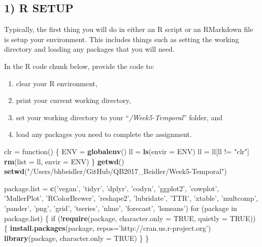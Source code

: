 \documentclass[]{article}
\newenvironment{Shaded}{\begin{snugshade}}{\end{snugshade}}
\newcommand{\KeywordTok}[1]{\textcolor[rgb]{0.13,0.29,0.53}{\textbf{{#1}}}}
\newcommand{\DataTypeTok}[1]{\textcolor[rgb]{0.13,0.29,0.53}{{#1}}}
\newcommand{\StringTok}[1]{\textcolor[rgb]{0.31,0.60,0.02}{{#1}}}
\newcommand{\OtherTok}[1]{\textcolor[rgb]{0.56,0.35,0.01}{{#1}}}
\newcommand{\NormalTok}[1]{{#1}}
\providecommand{\tightlist}{%
  \setlength{\itemsep}{0pt}\setlength{\parskip}{0pt}}
\begin{document}
\subsection{1) R SETUP}\label{r-setup}

Typically, the first thing you will do in either an R script or an
RMarkdown file is setup your environment. This includes things such as
setting the working directory and loading any packages that you will
need.

In the R code chunk below, provide the code to:

\begin{enumerate}
\def\labelenumi{\arabic{enumi}.}
\tightlist
\item
  clear your R environment,
\item
  print your current working directory,
\item
  set your working directory to your ``\emph{/Week5-Temporal}'' folder,
  and
\item
  load any packages you need to complete the assignment.
\end{enumerate}

\begin{Shaded}
\begin{Highlighting}[]
\NormalTok{clr =}\StringTok{ }\NormalTok{function() \{}
  \NormalTok{ENV =}\StringTok{ }\KeywordTok{globalenv}\NormalTok{()}
  \NormalTok{ll =}\StringTok{ }\KeywordTok{ls}\NormalTok{(}\DataTypeTok{envir =} \NormalTok{ENV)}
  \NormalTok{ll =}\StringTok{ }\NormalTok{ll[ll !=}\StringTok{ "clr"}\NormalTok{]}
  \KeywordTok{rm}\NormalTok{(}\DataTypeTok{list =} \NormalTok{ll, }\DataTypeTok{envir =} \NormalTok{ENV)}
\NormalTok{\}}
\KeywordTok{getwd}\NormalTok{() }
\KeywordTok{setwd}\NormalTok{(}\StringTok{"/Users/bhbeidler/GitHub/QB2017_Beidler/Week5-Temporal"}\NormalTok{)}

\NormalTok{package.list =}\StringTok{ }\KeywordTok{c}\NormalTok{(}\StringTok{'vegan'}\NormalTok{, }\StringTok{'tidyr'}\NormalTok{, }\StringTok{'dplyr'}\NormalTok{, }\StringTok{'codyn'}\NormalTok{, }\StringTok{'ggplot2'}\NormalTok{,}
\StringTok{'cowplot'}\NormalTok{, }\StringTok{'MullerPlot'}\NormalTok{, }\StringTok{'RColorBrewer'}\NormalTok{, }\StringTok{'reshape2'}\NormalTok{, }\StringTok{'lubridate'}\NormalTok{,}
\StringTok{'TTR'}\NormalTok{, }\StringTok{'xtable'}\NormalTok{, }\StringTok{'multcomp'}\NormalTok{, }\StringTok{'pander'}\NormalTok{, }\StringTok{'png'}\NormalTok{, }\StringTok{'grid'}\NormalTok{, }\StringTok{'tseries'}\NormalTok{, }\StringTok{'nlme'}\NormalTok{, }\StringTok{'forecast'}\NormalTok{, }\StringTok{'lsmeans'}\NormalTok{)}
\NormalTok{for (package in package.list) \{}
\NormalTok{if (!}\KeywordTok{require}\NormalTok{(package, }\DataTypeTok{character.only =} \OtherTok{TRUE}\NormalTok{, }\DataTypeTok{quietly =} \OtherTok{TRUE}\NormalTok{)) \{}
\KeywordTok{install.packages}\NormalTok{(package, }\DataTypeTok{repos=}\StringTok{'http://cran.us.r-project.org'}\NormalTok{)}
\KeywordTok{library}\NormalTok{(package, }\DataTypeTok{character.only =} \OtherTok{TRUE}\NormalTok{) \}}
\NormalTok{\}}
\end{Highlighting}
\end{Shaded}
\end{document}
